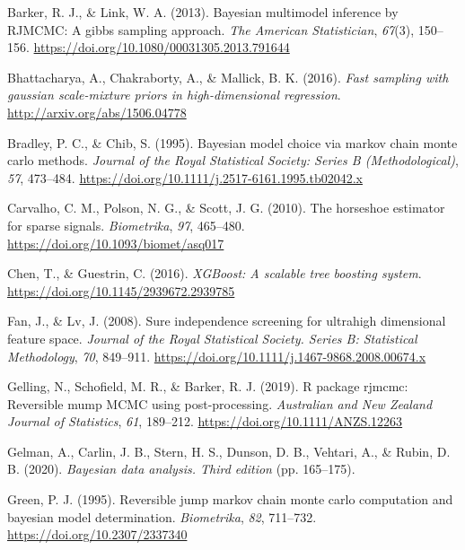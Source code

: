 \documentclass[
  11pt,
]{article}
\newlength{\cslhangindent}
\newlength{\cslentryspacingunit} %
\newenvironment{CSLReferences}[2] %
 {%
  \setlength{\parindent}{0pt}
  \ifodd #1
  \let\oldpar\par
  \def\par{\hangindent=\cslhangindent\oldpar}
  \fi
  \setlength{\parskip}{#2\cslentryspacingunit}
 }%
 {}
\begin{document}
\hypertarget{refs}{}
\begin{CSLReferences}{1}{0}
\leavevmode{}%
Barker, R. J., \& Link, W. A. (2013). Bayesian multimodel inference by
RJMCMC: A gibbs sampling approach. \emph{The American Statistician},
\emph{67}(3), 150--156.
\url{https://doi.org/10.1080/00031305.2013.791644}

\leavevmode{}%
Bhattacharya, A., Chakraborty, A., \& Mallick, B. K. (2016). \emph{Fast
sampling with gaussian scale-mixture priors in high-dimensional
regression}. \url{http://arxiv.org/abs/1506.04778}

\leavevmode{}%
Bradley, P. C., \& Chib, S. (1995). Bayesian model choice via markov
chain monte carlo methods. \emph{Journal of the Royal Statistical
Society: Series B (Methodological)}, \emph{57}, 473--484.
\url{https://doi.org/10.1111/j.2517-6161.1995.tb02042.x}

\leavevmode{}%
Carvalho, C. M., Polson, N. G., \& Scott, J. G. (2010). The horseshoe
estimator for sparse signals. \emph{Biometrika}, \emph{97}, 465--480.
\url{https://doi.org/10.1093/biomet/asq017}

\leavevmode{}%
Chen, T., \& Guestrin, C. (2016). \emph{XGBoost: A scalable tree
boosting system}. \url{https://doi.org/10.1145/2939672.2939785}

\leavevmode{}%
Fan, J., \& Lv, J. (2008). Sure independence screening for ultrahigh
dimensional feature space. \emph{Journal of the Royal Statistical
Society. Series B: Statistical Methodology}, \emph{70}, 849--911.
\url{https://doi.org/10.1111/j.1467-9868.2008.00674.x}

\leavevmode{}%
Gelling, N., Schofield, M. R., \& Barker, R. J. (2019). R package
rjmcmc: Reversible mump MCMC using post-processing. \emph{Australian and
New Zealand Journal of Statistics}, \emph{61}, 189--212.
\url{https://doi.org/10.1111/ANZS.12263}

\leavevmode{}%
Gelman, A., Carlin, J. B., Stern, H. S., Dunson, D. B., Vehtari, A., \&
Rubin, D. B. (2020). \emph{Bayesian data analysis. Third edition} (pp.
165--175).

\leavevmode{}%
Green, P. J. (1995). Reversible jump markov chain monte carlo
computation and bayesian model determination. \emph{Biometrika},
\emph{82}, 711--732. \url{https://doi.org/10.2307/2337340}


\end{CSLReferences}
\end{document}
